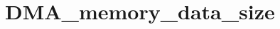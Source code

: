 \hypertarget{group___d_m_a__memory__data__size}{\section{D\-M\-A\-\_\-memory\-\_\-data\-\_\-size}
\label{group___d_m_a__memory__data__size}
}
